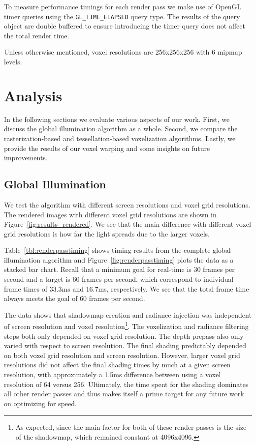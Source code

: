 To measure performance timings for each render pass we make use of OpenGL timer queries using the \verb#GL_TIME_ELAPSED# query type. The results of the query object are double buffered to ensure introducing the timer query does not affect the total render time.

Unless otherwise mentioned, voxel resolutions are 256x256x256 with 6 mipmap levels.

\section{Analysis}
In the following sections we evaluate various aspects of our work. First, we discuss the global illumination algorithm as a whole. Second, we compare the rasterization-based and tessellation-based voxelization algorithms. Lastly, we provide the results of our voxel warping and some insights on future improvements.

\subsection{Global Illumination}
We test the algorithm with different screen resolutions and voxel grid resolutions. The rendered images with different voxel grid resolutions are shown in Figure~\ref{fig:results_rendered}. We see that the main difference with different voxel grid resolutions is how far the light spreads due to the larger voxels.

Table~\ref{tbl:renderpasstiming} shows timing results from the complete global illumination algorithm and Figure~\ref{fig:renderpasstiming} plots the data as a stacked bar chart. Recall that a minimum goal for real-time is 30 frames per second and a target is 60 frames per second, which correspond to individual frame times of 33.3ms and 16.7ms, respectively. We see that the total frame time always meets the goal of 60 frames per second.

The data shows that shadowmap creation and radiance injection was independent of screen resolution and voxel resolution\footnote{As expected, since the main factor for both of these render passes is the size of the shadowmap, which remained constant at 4096x4096.}. The voxelization and radiance filtering steps both only depended on voxel grid resolution. The depth prepass also only varied with respect to screen resolution. The final shading predictably depended on both voxel grid resolution and screen resolution. However, larger voxel grid resolutions did not affect the final shading times by much at a given screen resolution, with approximately a 1.5ms difference between using a voxel resolution of 64 versus 256. Ultimately, the time spent for the shading dominates all other render passes and thus makes itself a prime target for any future work on optimizing for speed.

